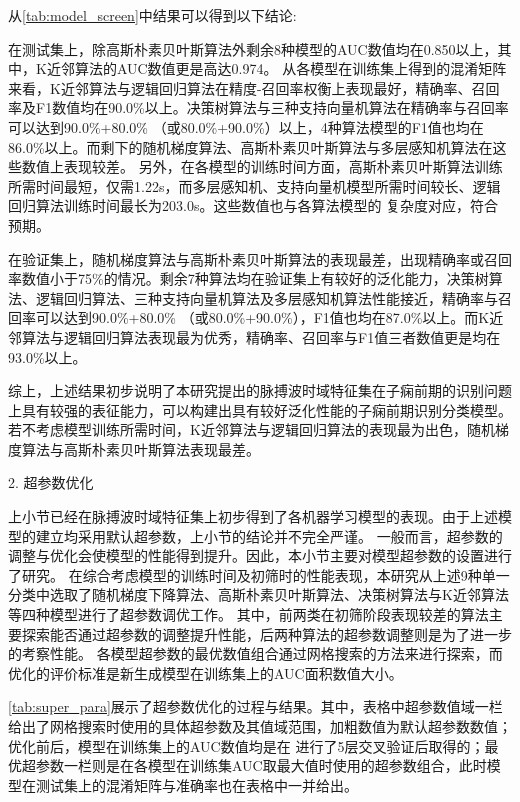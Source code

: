 从\autoref{tab:model_screen}中结果可以得到以下结论:

 在测试集上，除高斯朴素贝叶斯算法外剩余8种模型的AUC数值均在0.850以上，其中，K近邻算法的AUC数值更是高达0.974。
从各模型在训练集上得到的混淆矩阵来看，K近邻算法与逻辑回归算法在精度-召回率权衡上表现最好，精确率、召回率及F1数值均在90.0\%以上。决策树算法与三种支持向量机算法在精确率与召回率可以达到90.0\%+80.0\%
（或80.0\%+90.0\%）以上，4种算法模型的F1值也均在86.0\%以上。而剩下的随机梯度算法、高斯朴素贝叶斯算法与多层感知机算法在这些数值上表现较差。
另外，在各模型的训练时间方面，高斯朴素贝叶斯算法训练所需时间最短，仅需1.22s，而多层感知机、支持向量机模型所需时间较长、逻辑回归算法训练时间最长为203.0s。这些数值也与各算法模型的
复杂度对应，符合预期。

 在验证集上，随机梯度算法与高斯朴素贝叶斯算法的表现最差，出现精确率或召回率数值小于75\%的情况。剩余7种算法均在验证集上有较好的泛化能力，决策树算法、逻辑回归算法、三种支持向量机算法及多层感知机算法性能接近，精确率与召回率可以达到90.0\%+80.0\%
（或80.0\%+90.0\%），F1值也均在87.0\%以上。而K近邻算法与逻辑回归算法表现最为优秀，精确率、召回率与F1值三者数值更是均在93.0\%以上。

综上，上述结果初步说明了本研究提出的脉搏波时域特征集在子痫前期的识别问题上具有较强的表征能力，可以构建出具有较好泛化性能的子痫前期识别分类模型。
若不考虑模型训练所需时间，K近邻算法与逻辑回归算法的表现最为出色，随机梯度算法与高斯朴素贝叶斯算法表现最差。


2. 超参数优化

上小节已经在脉搏波时域特征集上初步得到了各机器学习模型的表现。由于上述模型的建立均采用默认超参数，上小节的结论并不完全严谨。
一般而言，超参数的调整与优化会使模型的性能得到提升。因此，本小节主要对模型超参数的设置进行了研究。
在综合考虑模型的训练时间及初筛时的性能表现，本研究从上述9种单一分类中选取了随机梯度下降算法、高斯朴素贝叶斯算法、决策树算法与K近邻算法等四种模型进行了超参数调优工作。
其中，前两类在初筛阶段表现较差的算法主要探索能否通过超参数的调整提升性能，后两种算法的超参数调整则是为了进一步的考察性能。
各模型超参数的最优数值组合通过网格搜索的方法来进行探索，而优化的评价标准是新生成模型在训练集上的AUC面积数值大小。

\autoref{tab:super_para}展示了超参数优化的过程与结果。其中，表格中超参数值域一栏给出了网格搜索时使用的具体超参数及其值域范围，加粗数值为默认超参数数值；优化前后，模型在训练集上的AUC数值均是在
进行了5层交叉验证后取得的；最优超参数一栏则是在各模型在训练集AUC取最大值时使用的超参数组合，此时模型在测试集上的混淆矩阵与准确率也在表格中一并给出。


